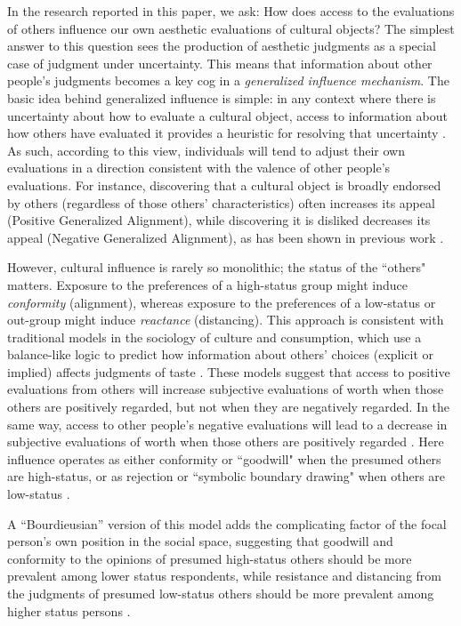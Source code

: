 \documentclass[12pt, letterpaper]{article}
\begin{document}
In the research reported in this paper, we ask: How does access to the evaluations of others influence our own aesthetic evaluations of cultural objects? The simplest answer to this question sees the production of aesthetic judgments as a special case of judgment under uncertainty. This means that information about other people's judgments becomes a key cog in a \textit{generalized influence mechanism}. The basic idea behind generalized influence is simple: in any context where there is uncertainty about how to evaluate a cultural object, access to information about how others have evaluated it provides a heuristic for resolving that uncertainty \citep{strang2001search-10a}. As such, according to this view, individuals will tend to adjust their own evaluations in a direction consistent with the valence of other people's evaluations. For instance, discovering that a cultural object is broadly endorsed by others (regardless of those others' characteristics) often increases its appeal (Positive Generalized Alignment), while discovering it is disliked decreases its appeal (Negative Generalized Alignment), as has been shown in previous work \citep{salganik2006experimental-88d}.

However, cultural influence is rarely so monolithic; the status of the ``others" matters. Exposure to the preferences of a high-status group might induce \textit{conformity} (alignment), whereas exposure to the preferences of a low-status or out-group might induce \textit{reactance} (distancing). This approach is consistent with traditional models in the sociology of culture and consumption, which use a balance-like logic \citep{heider1946attitudes-ff3} to predict how information about others' choices (explicit or implied) affects judgments of taste \citep{okada2017structure}. These models suggest that access to positive evaluations from others will increase subjective evaluations of worth when those others are positively regarded, but not when they are negatively regarded. In the same way, access to other people’s negative evaluations will lead to a decrease in subjective evaluations of worth when those others are positively regarded \citep{lizardo2016cultural-aaa}. Here influence operates as either conformity or ``goodwill" \citep{bourdieu1984} when the presumed others are high-status, or as rejection or ``symbolic boundary drawing" when others are low-status \citep{bryson1996, lizardo2016cultural-aaa}. 

A ``Bourdieusian'' \citep {bourdieu1984} version of this model adds the complicating factor of the focal person's own position in the social space, suggesting that goodwill and conformity to the opinions of presumed high-status others should be more prevalent among lower status respondents, while resistance and distancing from the judgments of presumed low-status others should be more prevalent among higher status persons \citep{lizardo2016cultural-aaa}.
\end{document}
